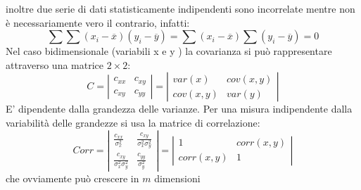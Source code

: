 \documentclass[a4paper,12pt, oneside]{book}
\begin{document}
inoltre due serie di dati statisticamente indipendenti sono incorrelate mentre non è necessariamente vero il contrario, infatti:
$$\sum \sum (x_i-\overline{x})(y_i-\overline{y})=\sum (x_i-\overline{x})\sum(y_i-\overline{y})=0$$
Nel caso bidimensionale (variabili x e y ) la covarianza si può rappresentare
attraverso una matrice $2\times 2$:
$$C=\left|\begin{matrix}
c_{xx} & c_{xy}\\
c_{xy} & c_	{yy}
\end{matrix}\right|=\left|\begin{matrix}
var(x) & cov(x,y)\\
cov(x,y) & var(y)
\end{matrix}\right|$$
E’ dipendente dalla grandezza delle varianze.
Per una misura indipendente dalla variabilità delle grandezze si usa la
matrice di correlazione:
$$Corr=\left|\begin{matrix}
\frac{c_{xx}}{\sigma_x^2} & \frac{c_{xy}}{\sigma_x^2\sigma_y^2} \\
\frac{c_{xy}}{\sigma_x^2\sigma_y^2}   & \frac{c_{yy}}{\sigma_y^2} 
\end{matrix}\right|=\left|\begin{matrix}
1 & corr(x,y)\\
corr(x,y) & 1
\end{matrix}\right|$$
che ovviamente può crescere in $m$ dimensioni
\end{document}
